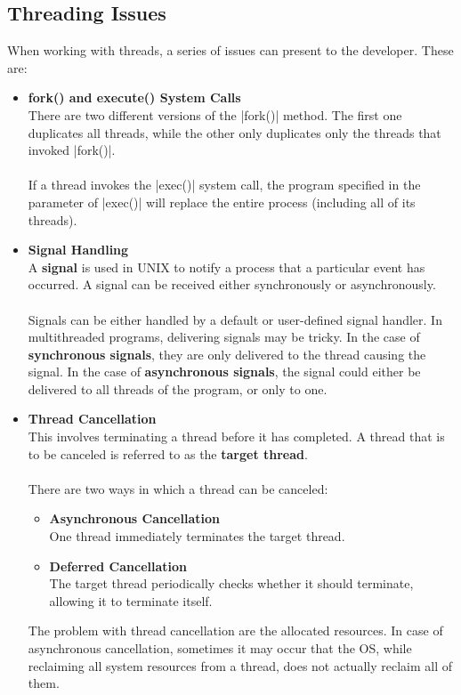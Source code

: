 \documentclass{article}
\begin{document}
\subsection{Threading Issues}
When working with threads, a series of issues can present to the developer. These are:

\begin{itemize}
	\item \textbf{fork() and execute() System Calls}
	\vspace{.2cm} \\
	There are two different versions of the \cverb|fork()| method. The first one duplicates all threads, while the other only duplicates only the threads that invoked \cverb|fork()|. \\ \\
	If a thread invokes the \cverb|exec()| system call, the program specified in the parameter of \cverb|exec()| will replace the entire process (including all of its threads).
	
	\item \textbf{Signal Handling}
	\vspace{.2cm} \\
	A \textbf{signal} is used in UNIX to notify a process that a particular event has occurred. A signal can be received either synchronously or asynchronously. \\ \\
	Signals can be either handled  by a default or user-defined signal handler. In multithreaded programs, delivering signals may be tricky. In the case of \textbf{synchronous signals}, they are only delivered to the thread causing the signal. In the case of \textbf{asynchronous signals}, the signal could either be delivered to all threads of the program, or only to one.
	
	\item \textbf{Thread Cancellation}
	\vspace{.2cm} \\
	This involves terminating a thread before it has completed. A thread that is to be canceled is referred to as the \textbf{target thread}. \\ \\
	There are two ways in which a thread can be canceled:
	
	\begin{itemize}
		\item \textbf{Asynchronous Cancellation}
		\vspace{.2cm} \\
		One thread immediately terminates the target thread.
		
		\item \textbf{Deferred Cancellation}
		\vspace{.2cm} \\
		The target thread periodically checks whether it should terminate, allowing it to terminate itself.
	\end{itemize}
	The problem with thread cancellation are the allocated resources. In case of asynchronous cancellation, sometimes it may occur that the OS, while reclaiming all system resources from a thread, does not actually reclaim all of them.
\end{itemize}
\end{document}
